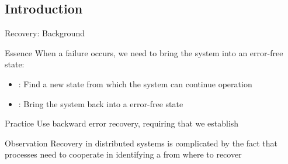 \subsection{Introduction}
\begin{slide}{Recovery: Background}
  \begin{block}{Essence}
    When a failure occurs, we need to bring the system into an error-free state:
    \begin{itemize}
    \item {}: Find a new state from which the system can continue operation
    \item {}: Bring the system back into a  error-free state
    \end{itemize}
  \end{block}
  \begin{alertblock}{Practice} 
    Use backward error recovery, requiring that we establish 
  \end{alertblock}
  \begin{block}{Observation} 
    Recovery in distributed systems is complicated by the fact that processes need to cooperate in identifying
    a  from where to recover
  \end{block}
\end{slide}
